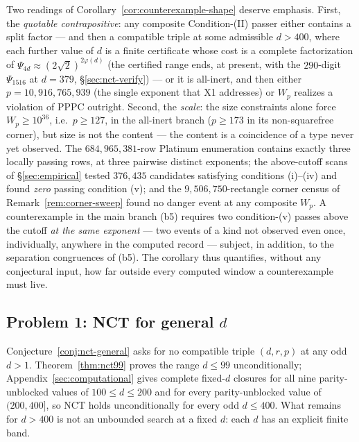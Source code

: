 \documentclass[11pt]{amsart}
\theoremstyle{plain}
\theoremstyle{definition}
\theoremstyle{remark}
\numberwithin{equation}{section}
\begin{document}
Two readings of Corollary~\ref{cor:counterexample-shape} deserve
emphasis. First, the \emph{quotable contrapositive}: any composite
Condition-(II) passer either contains a split factor --- and then a
compatible triple at some admissible $d > 400$, where each further value
of $d$ is a finite certificate whose cost is a complete factorization of
$\Psi_{4d} \approx (2\sqrt 2)^{2\varphi(d)}$ (the certified range ends,
at present, with the $290$-digit $\Psi_{1516}$ at $d = 379$,
\S\ref{sec:nct-verify}) --- or it is all-inert, and then either
$p = 10{,}916{,}765{,}939$ (the single exponent that X1 addresses) or
$W_p$ realizes a violation of PPPC outright. Second, the \emph{scale}:
the size constraints alone force $W_p \geq 10^{36}$, i.e.\ $p \geq 127$,
in the all-inert branch ($p \geq 173$ in its non-squarefree corner), but
size is not the content --- the content is a coincidence of a type never
yet observed. The $684{,}965{,}381$-row Platinum enumeration contains
exactly three locally passing rows, at three pairwise distinct
exponents; the above-cutoff scans of \S\ref{sec:empirical} tested
$376{,}435$ candidates satisfying conditions (i)--(iv) and found
\emph{zero} passing condition (v); and the $9{,}506{,}750$-rectangle
corner census of Remark~\ref{rem:corner-sweep} found no danger event at
any composite $W_p$. A counterexample in the main branch (b5) requires
two condition-(v) passes above the cutoff \emph{at the same exponent} ---
two events of a kind not observed even once, individually, anywhere in
the computed record --- subject, in addition, to the separation
congruences of (b5). The corollary thus quantifies, without any
conjectural input, how far outside every computed window a
counterexample must live.

\subsection{Problem 1: NCT for general \texorpdfstring{$d$}{d}}\label{sec:nct-problem}

Conjecture~\ref{conj:nct-general} asks for no compatible triple $(d,r,p)$ at any odd $d>1$. Theorem~\ref{thm:nct99} proves the range $d\leq 99$ unconditionally; Appendix~\ref{sec:computational} gives complete fixed-$d$ closures for all nine parity-unblocked values of $100 \leq d \leq 200$ and for every parity-unblocked value of $(200, 400]$, so NCT holds unconditionally for every odd $d \leq 400$. What remains for $d > 400$ is not an unbounded search at a fixed $d$: each $d$ has an explicit finite band.
\end{document}
